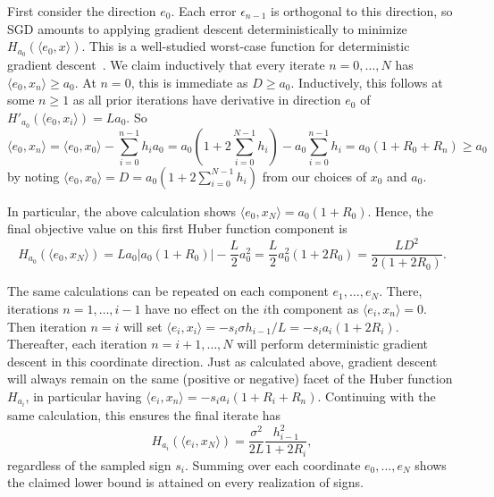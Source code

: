 \documentclass[11pt, hidelinks]{article}
\begin{document}
    First consider the direction $e_0$. Each error $\epsilon_{n-1}$ is orthogonal to this direction, so SGD amounts to applying gradient descent deterministically to minimize $H_{a_0}(\langle e_0, x \rangle)$. This is a well-studied worst-case function for deterministic gradient descent~\cite{}. We claim inductively that every iterate $n=0,\dots,N$ has $\langle e_0, x_n\rangle \geq a_0$. At $n=0$, this is immediate as $D\geq a_0$. Inductively, this follows at some $n\geq 1$ as all prior iterations have derivative in direction $e_0$ of $H'_{a_0}(\langle e_0, x_{i}\rangle) = La_0$. So
    \begin{equation*}
        \langle e_0, x_n\rangle = \langle e_0, x_0\rangle - \sum_{i=0}^{n-1} h_i a_0 = a_0\left(1+2\sum_{i=0}^{N-1} h_i\right) - a_0 \sum_{i=0}^{n-1} h_i = a_0(1+R_0+R_n) \geq a_0
    \end{equation*}
    by noting $\langle e_0, x_0\rangle =D= a_0\left(1+2\sum_{i=0}^{N-1} h_i\right)$ from our choices of $x_0$ and $a_0$.
    
    In particular, the above calculation shows $\langle e_0, x_N\rangle = a_0(1+R_0)$. Hence, the final objective value on this first Huber function component is
    \begin{equation*}
        H_{a_0}(\langle e_0,x_N\rangle) = La_0| a_0(1+R_0)| - \frac{L}{2}a_0^2 = \frac{L}{2}a_0^2(1+2R_0) = \frac{LD^2}{2(1+2R_0)}.
    \end{equation*}

    The same calculations can be repeated on each component $e_1,\dots,e_N$. There, iterations $n=1,\dots,i-1$ have no effect on the $i$th component as $\langle e_i,x_n\rangle=0$. Then iteration $n=i$ will set $\langle e_i,x_i\rangle = -s_{i}\sigma h_{i-1}/L = -s_ia_i(1+2R_i)$. Thereafter, each iteration $n=i+1,\dots,N$ will perform deterministic gradient descent in this coordinate direction. Just as calculated above, gradient descent will always remain on the same (positive or negative) facet of the Huber function $H_{a_i}$, in particular having $\langle e_i,x_n\rangle = -s_ia_i(1+R_i+R_n)$. Continuing with the same calculation, this ensures the final iterate has 
    \begin{equation*}
        H_{a_i}(\langle e_i,x_N\rangle) = \frac{\sigma^2}{2L}\frac{h_{i-1}^2}{1+2 R_{i}},
    \end{equation*}
    regardless of the sampled sign $s_i$. Summing over each coordinate $e_0,\dots,e_{N}$ shows the claimed lower bound is attained on every realization of signs.
\end{document}
